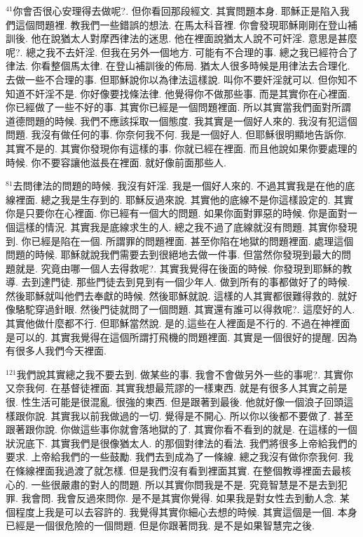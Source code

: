 \documentclass{book}
\begin{document}
$^{41}$你會否很心安理得去做呢?.
但你看回那段經文.
其實問題本身.
耶穌正是陷入我們這個問題裡.
教我們一些錯誤的想法.
在馬太科音裡.
你會發現耶穌剛剛在登山補訓後.
他在說猶太人對摩西律法的迷思.
他在裡面說猶太人說不可奸淫.
意思是甚麼呢?.
總之我不去奸淫.
但我在另外一個地方.
可能有不合理的事.
總之我已經符合了律法.
你看整個馬太律.
在登山補訓後的佈局.
猶太人很多時候是用律法去合理化.
去做一些不合理的事.
但耶穌說你以為律法這樣說.
叫你不要奸淫就可以.
但你知不知道不奸淫不是.
你好像要找條法律.
他覺得你不做那些事.
而是其實你在心裡面.
你已經做了一些不好的事.
其實你已經是一個問題裡面.
所以其實當我們面對所謂道德問題的時候.
我們不應該採取一個態度.
我其實是一個好人來的.
我沒有犯這個問題.
我沒有做任何的事.
你奈何我不何.
我是一個好人.
但耶穌很明顯地告訴你.
其實不是的.
其實你發現你有這樣的事.
你就已經在裡面.
而且他說如果你要處理的時候.
你不要容讓他滋長在裡面.
就好像前面那些人.

$^{81}$去問律法的問題的時候.
我沒有奸淫.
我是一個好人來的.
不過其實我是在他的底線裡面.
總之我是生存到的.
耶穌反過來說.
其實他的底線不是你這樣設定的.
其實你是只要你在心裡面.
你已經有一個大的問題.
如果你面對罪惡的時候.
你是面對一個這樣的情況.
其實我是底線求生的人.
總之我不過了底線就沒有問題.
其實你發現到.
你已經是陷在一個.
所謂罪的問題裡面.
甚至你陷在地獄的問題裡面.
處理這個問題的時候.
耶穌就說我們需要去到很絕地去做一件事.
但當然你發現到最大的問題就是.
究竟由哪一個人去得救呢?.
其實我覺得在後面的時候.
你發現到耶穌的教導.
去到達門徒.
那些門徒去到見到有一個少年人.
做到所有的事都做好了的時候.
然後耶穌就叫他們去奉獻的時候.
然後耶穌就說.
這樣的人其實都很難得救的.
就好像駱駝穿過針眼.
然後門徒就問了一個問題.
其實還有誰可以得救呢?.
這麼好的人.
其實他做什麼都不行.
但耶穌當然說.
是的,這些在人裡面是不行的.
不過在神裡面是可以的.
其實我覺得在這個所謂打飛機的問題裡面.
其實是一個很好的提醒.
因為有很多人我們今天裡面.

$^{121}$我們說其實總之我不要去到.
做某些的事.
我會不會做另外一些的事呢?.
其實你又奈我何.
在基督徒裡面.
其實我想最荒謬的一樣東西.
就是有很多人其實之前是很.
性生活可能是很混亂.
很強的東西.
但是跟著到最後.
他就好像一個浪子回頭這樣跟你說.
其實我以前我做過的一切.
覺得是不開心.
所以你以後都不要做了.
甚至跟著跟你說.
你做這些事你就會落地獄的了.
其實你看不看到的就是.
在這樣的一個狀況底下.
其實我們是很像猶太人.
的那個對律法的看法.
我們將很多上帝給我們的要求.
上帝給我們的一些鼓勵.
我們去到成為了一條線.
總之我沒有做你奈我何.
我在條線裡面我過渡了就怎樣.
但是我們沒有看到裡面其實.
在整個教導裡面去最核心的.
一些很嚴肅的對人的問題.
所以其實你問我是不是.
究竟智慧是不是去到犯罪.
我會問.
我會反過來問你.
是不是其實你覺得.
如果我是對女性去到動人念.
某個程度上我是可以去容許的.
我覺得其實你細心去想的時候.
其實這個是一個.
本身已經是一個很危險的一個問題.
但是你跟著問我.
是不是如果智慧完之後.
\end{document}
